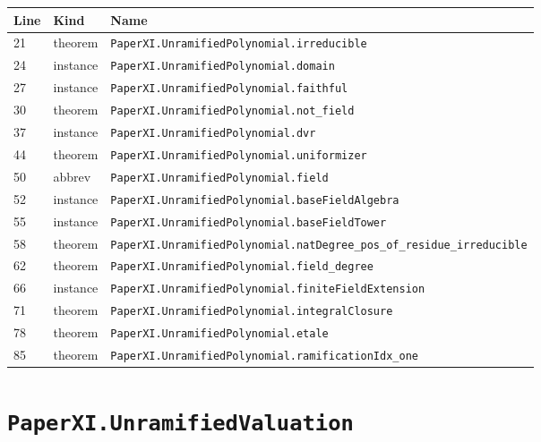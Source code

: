 \documentclass[10pt,oneside]{book}
\begin{document}
\begin{longtable}{@{}p{}p{}p{}@{}}\toprule Line&Kind&Name\\\midrule\endhead

21&theorem&\nolinkurl{PaperXI.UnramifiedPolynomial.irreducible}\\

24&instance&\nolinkurl{PaperXI.UnramifiedPolynomial.domain}\\

27&instance&\nolinkurl{PaperXI.UnramifiedPolynomial.faithful}\\

30&theorem&\nolinkurl{PaperXI.UnramifiedPolynomial.not_field}\\

37&instance&\nolinkurl{PaperXI.UnramifiedPolynomial.dvr}\\

44&theorem&\nolinkurl{PaperXI.UnramifiedPolynomial.uniformizer}\\

50&abbrev&\nolinkurl{PaperXI.UnramifiedPolynomial.field}\\

52&instance&\nolinkurl{PaperXI.UnramifiedPolynomial.baseFieldAlgebra}\\

55&instance&\nolinkurl{PaperXI.UnramifiedPolynomial.baseFieldTower}\\

58&theorem&\nolinkurl{PaperXI.UnramifiedPolynomial.natDegree_pos_of_residue_irreducible}\\

62&theorem&\nolinkurl{PaperXI.UnramifiedPolynomial.field_degree}\\

66&instance&\nolinkurl{PaperXI.UnramifiedPolynomial.finiteFieldExtension}\\

71&theorem&\nolinkurl{PaperXI.UnramifiedPolynomial.integralClosure}\\

78&theorem&\nolinkurl{PaperXI.UnramifiedPolynomial.etale}\\

85&theorem&\nolinkurl{PaperXI.UnramifiedPolynomial.ramificationIdx_one}\\

\bottomrule\end{longtable}

\section{\texorpdfstring{\nolinkurl{PaperXI.UnramifiedValuation}}{PaperXI.UnramifiedValuation}}\label{module:PaperXI.UnramifiedValuation}
\end{document}
